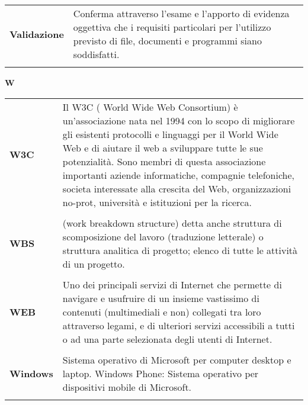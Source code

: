 {\normalsize 
\begin{longtable}{L{4cm} p{10cm}}
\textbf{Validazione} & Conferma attraverso l’esame e l'apporto di evidenza oggettiva che i requisiti particolari per l'utilizzo previsto di file, documenti e programmi siano soddisfatti. \\ 
 \\ 
\end{longtable} 
\newpage 
{} 
{} 
\hfill\Huge{\textbf{W}} \\ 
\normalsize 
\begin{longtable}{L{4cm} p{10cm}}
\textbf{W3C} & Il W3C ( World Wide Web Consortium) è un’associazione nata nel 1994 con lo scopo di migliorare gli esistenti protocolli e linguaggi per il World Wide Web e di aiutare il web a sviluppare tutte le sue potenzialità. Sono membri di questa associazione importanti aziende informatiche, compagnie telefoniche, societa interessate alla crescita del Web, organizzazioni no-prot, università e istituzioni per la ricerca. \\ 
 \\ 
\textbf{WBS} & (work breakdown structure) detta anche struttura di scomposizione del lavoro (traduzione letterale) o struttura analitica di progetto; elenco di tutte le attività di un progetto. \\ 
 \\ 
\textbf{WEB} & Uno dei principali servizi di Internet che permette di navigare e usufruire di un insieme vastissimo di contenuti (multimediali e non) collegati tra loro attraverso legami, e di ulteriori servizi accessibili a tutti o ad una parte selezionata degli utenti di Internet. \\ 
 \\ 
\textbf{Windows} & Sistema operativo di Microsoft per computer desktop e laptop. Windows Phone: Sistema operativo per dispositivi mobile di Microsoft. \\ 
 \\ 
\end{longtable} 


 }